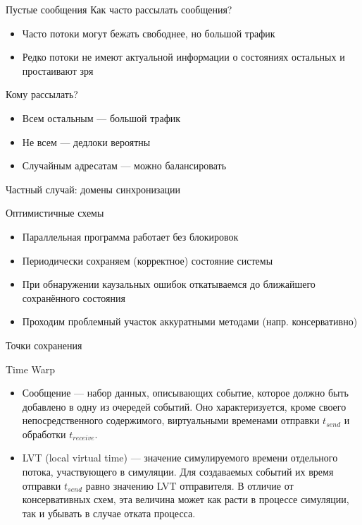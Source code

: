 \documentclass{beamer}
\begin{document}
\begin{frame}{Пустые сообщения}
Как часто рассылать сообщения?

\begin{itemize}
\item Часто \textrightarrow{} потоки могут бежать свободнее, но большой трафик
\item Редко \textrightarrow{} потоки не имеют актуальной информации о состояниях остальных и простаивают зря
\end{itemize}

Кому рассылать?

\begin{itemize}
\item Всем остальным — большой трафик
\item Не всем — дедлоки вероятны
\item Случайным адресатам — можно балансировать
\end{itemize}

\end{frame}

\begin{frame}{Частный случай: домены синхронизации}
    \centering
   
\end{frame}

\begin{frame}{Оптимистичные схемы}
\begin{itemize}
\item Параллельная программа работает без блокировок
\item Периодически сохраняем (корректное) состояние системы
\item При обнаружении каузальных ошибок откатываемся до ближайшего сохранённого состояния
\item Проходим проблемный участок аккуратными методами (напр. консервативно)
\end{itemize}

\end{frame}

\begin{frame}{Точки сохранения}
\centering
 
\end{frame}

\begin{frame}{Time Warp}
\begin{itemize}
\item Сообщение — набор данных, описывающих событие, которое должно быть добавлено в одну из очередей событий. Оно
характеризуется, кроме своего непосредственного содержимого, виртуальными временами отправки $t_{send}$ и
обработки $t_{receive}$.
\item LVT (local virtual time) — значение симулируемого времени отдельного потока, участвующего в симуляции. Для создаваемых событий их время отправки $t_{send}$ равно значению LVT отправителя. В отличие от консервативных схем, эта величина может как расти в процессе симуляции, так и убывать в случае отката процесса.
\end{itemize}

\end{frame}
\end{document}
